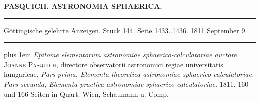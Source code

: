 \clearpage
{}
\noindent\makebox[10mm][l]{}%
\parbox[b]{\dimexpr\textwidth-20mm\relax}{\centering\small\textbf{PASQUICH. ASTRONOMIA SPHAERICA.}}%
\par\nobreak\medskip
\begin{center}
\parbox{.92\linewidth}{\centering\small
\rule{\linewidth}{.3pt}\par\smallskip
Göttingische gelehrte Anzeigen. Stück 144. Seite 1433..1436. 1811 September 9.\par\smallskip
\rule{\linewidth}{.3pt}}
\end{center}
\par\medskip

{\rightskip=0pt plus 1em \emph{Epitome elementorum astronomiae sphaerico-calculatoriae auctore} \textsc{Joanne Pasquich}, directore observatorii astronomici regiae universitatis hungaricae. \emph{Pars prima. Elementa {theoretica} astronomiae sphaerico-calculatoriae. Pars secunda, Elementa {practica} astronomiae sphaerico-calculatoriae.} 1811. 160 und 166 Seiten in Quart. Wien, Schaumann u. Comp.\par}


